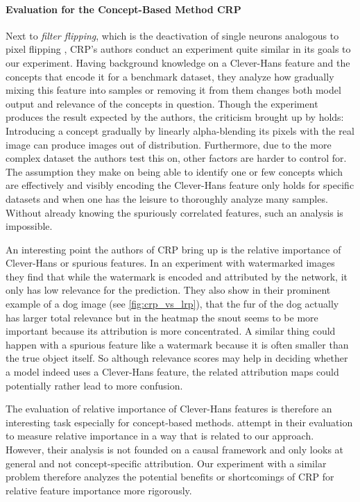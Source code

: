 \paragraph{Evaluation for the Concept-Based Method CRP}
Next to \textit{filter flipping}, which is the deactivation of single neurons analogous to pixel flipping \citep{Samek2017a}, CRP's authors conduct an experiment quite similar in its goals to our experiment. 
Having background knowledge on a Clever-Hans feature and the concepts that encode it for a benchmark dataset, they analyze how gradually mixing this feature into samples or removing it from them changes both model output and relevance of the concepts in question. 
Though the experiment produces the result expected by the authors, the criticism brought up by \cite{Hooker2019} holds: Introducing a concept gradually by linearly alpha-blending its pixels with the real image can produce images out of distribution. Furthermore, due to the more complex dataset the authors test this on, other factors are harder to control for. The assumption they make on being able to identify one or few concepts which are effectively and visibly encoding the Clever-Hans feature only holds for specific datasets and when one has the leisure to thoroughly analyze many samples. Without already knowing the spuriously correlated features, such an analysis is impossible. 

An interesting point the authors of CRP bring up is the relative importance of Clever-Hans or spurious features. In an experiment with watermarked images they find that while the watermark is encoded and attributed by the network, it only has low relevance for the prediction. They also show in their prominent example of a dog image (see \cref{fig:crp_vs_lrp}), that the fur of the dog actually has larger total relevance but in the heatmap the snout seems to be more important because its attribution is more concentrated. A similar thing could happen with a spurious feature like a watermark because it is often smaller than the true object itself. So although relevance scores may help in deciding whether a model indeed uses a Clever-Hans feature, the related attribution maps could potentially rather lead to more confusion.

The evaluation of relative importance of Clever-Hans features is therefore an interesting task especially for concept-based methods. \cite{Yang2019} attempt in their evaluation to measure relative importance in a way that is related to our approach. However, their analysis is not founded on a causal framework and only looks at general and not concept-specific attribution. 
Our experiment with a similar problem therefore analyzes the potential benefits or shortcomings of CRP for relative feature importance more rigorously. 

